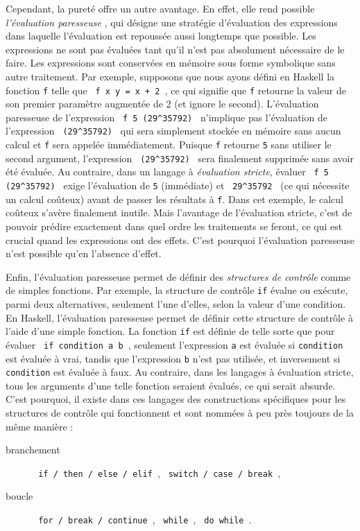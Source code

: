 \documentclass[a4paper,francais]{insalyon}
\begin{document}
Cependant, la pureté offre un autre avantage. En effet, elle rend possible \emph{l'évaluation paresseuse} \cite[Lecture 6: Lazy Evaluation]{coursHaskell}, qui désigne une stratégie d'évaluation des expressions dans laquelle l'évaluation est repoussée aussi longtemps que possible. Les expressions ne sont pas évaluées tant qu'il n'est pas absolument nécessaire de le faire. Les expressions sont conservées en mémoire sous forme symbolique sans autre traitement. Par exemple, supposons que nous ayons défini en Haskell la fonction \texttt{f} telle que \verb! f x y = x + 2 !, ce qui signifie que \texttt{f} retourne la valeur de son premier paramètre augmentée de 2 (et ignore le second). L'évaluation paresseuse de l'expression \verb! f 5 (29^35792) ! n'implique pas l'évaluation de l'expression \verb! (29^35792) ! qui sera simplement stockée en mémoire sans aucun calcul et \texttt{f} sera appelée immédiatement. Puisque \texttt{f} retourne \texttt{5} sans utiliser le second argument, l'expression \verb! (29^35792) ! sera finalement supprimée sans avoir été évaluée. Au contraire, dans un langage à \emph{évaluation stricte}, évaluer \verb! f 5 (29^35792) ! exige l'évaluation de \texttt{5} (immédiate) et \verb! 29^35792 ! (ce qui nécessite un calcul coûteux) avant de passer les résultats à \texttt{f}. Dans cet exemple, le calcul coûteux s'avère finalement inutile. Mais l'avantage de l'évaluation stricte, c'est de pouvoir prédire exactement dans quel ordre les traitements se feront, ce qui est crucial quand les expressions ont des effets. C'est pourquoi l'évaluation paresseuse n'est possible qu'en l'absence d'effet.

Enfin, l'évaluation paresseuse permet de définir des \emph{structures de contrôle} comme de simples fonctions. Par exemple, la structure de contrôle \texttt{if} évalue ou exécute, parmi deux alternatives, seulement l'une d'elles, selon la valeur d'une condition. En Haskell, l'évaluation paresseuse permet de définir cette structure de contrôle à l'aide d'une simple fonction. La fonction \texttt{if} est définie de telle sorte que pour évaluer \verb! if condition a b !, seulement l'expression \texttt{a} est évaluée si \texttt{condition} est évaluée à vrai, tandis que l'expression \texttt{b} n'est pas utilisée, et inversement si \texttt{condition} est évaluée à faux. Au contraire, dans les langages à évaluation stricte, tous les arguments d'une telle fonction seraient évalués, ce qui serait absurde. C'est pourquoi, il existe dans ces langages des constructions spécifiques pour les structures de contrôle qui fonctionnent et sont nommées à peu près toujours de la même manière :
\begin{description}
\item[branchement] \verb! if / then / else / elif !, \verb! switch / case / break !, 
\item[boucle] \verb! for / break / continue !, \verb! while !, \verb! do while !.
\end{description}
\end{document}
